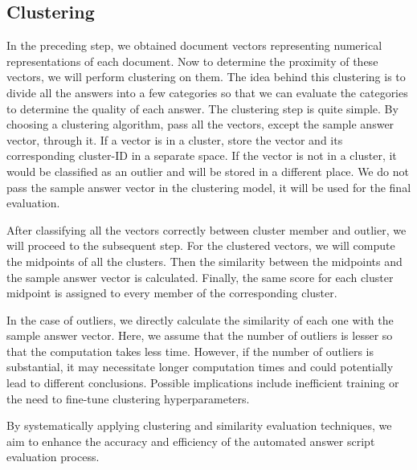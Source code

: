     \subsection{Clustering}
        \par
        In the preceding step, we obtained document vectors representing numerical representations of each document. Now to determine the proximity of these vectors, we will perform clustering on them. The idea behind this clustering is to divide all the answers into a few categories so that we can evaluate the categories to determine the quality of each answer. The clustering step is quite simple. By choosing a clustering algorithm, pass all the vectors, except the sample answer vector, through it. If a vector is in a cluster, store the vector and its corresponding cluster-ID in a separate space. If the vector is not in a cluster, it would be classified as an outlier and will be stored in a different place. We do not pass the sample answer vector in the clustering model, it will be used for the final evaluation.
        \par
        After classifying all the vectors correctly between cluster member and outlier, we will proceed to the subsequent step. For the clustered vectors, we will compute the midpoints of all the clusters. Then the similarity between the midpoints and the sample answer vector is calculated. Finally, the same score for each cluster midpoint is assigned to every member of the corresponding cluster.
        \par
        In the case of outliers, we directly calculate the similarity of each one with the sample answer vector. Here, we assume that the number of outliers is lesser so that the computation takes less time. However, if the number of outliers is substantial, it may necessitate longer computation times and could potentially lead to different conclusions. Possible implications include inefficient training or the need to fine-tune clustering hyperparameters.
        \par
        By systematically applying clustering and similarity evaluation techniques, we aim to enhance the accuracy and efficiency of the automated answer script evaluation process.

